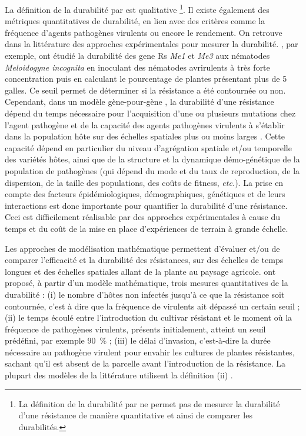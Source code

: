 	La définition de la durabilité par \citet{Johnson1984} est qualitative \footnote{La définition de la durabilité par \citet{Johnson1984} ne permet pas de mesurer la durabilité d'une résistance de manière quantitative et ainsi de comparer les durabilités.}. 
Il existe également des métriques quantitatives de durabilité, en lien avec des critères comme la fréquence d'agents pathogènes virulents ou encore le rendement. On retrouve dans la littérature des approches expérimentales pour mesurer la durabilité.
\citet{Barbary2014}, par exemple, ont étudié la durabilité des \glspl{gene R} \textit{Me1}  et \textit{Me3}  aux nématodes \textit{Meloidogyne incognita} en inoculant des nématodes avrirulents à très forte concentration puis en calculant le pourcentage de plantes présentant plus de 5 galles. Ce seuil permet de déterminer si la résistance a été contournée ou non. 
Cependant, dans un modèle \og gène-pour-gène  \fg, la durabilité d'une résistance dépend du temps nécessaire pour l'acquisition d'une ou plusieurs  mutations chez l'agent pathogène et de la capacité des agents pathogènes virulents à s'établir dans la population hôte sur des échelles spatiales plus ou moins larges \citep{Barrett2008, Brown2015, McDonald2002,  Stuthman2007, vandenBosch2003, Zhan2015}. Cette capacité dépend en particulier du niveau d’agrégation spatiale et/ou temporelle des variétés hôtes, ainsi que de la structure et la dynamique démo-génétique de la population de pathogènes (qui dépend du mode  et du taux de reproduction, de la dispersion, de la taille des populations, des coûts de fitness, \textit{etc.}). La prise en compte des facteurs épidémiologiques, démographiques, génétiques  et de leurs interactions  est donc importante pour quantifier la durabilité d'une résistance. Ceci est difficilement réalisable par des approches expérimentales à cause du temps et du coût de la mise en place d'expériences de terrain à grande échelle.

	Les approches de modélisation mathématique permettent d'évaluer et/ou de comparer l'efficacité et la durabilité des résistances, sur des échelles de temps longues et des échelles spatiales allant de la plante au paysage agricole. \citet{vandenBosch2003} ont proposé, à partir d’un modèle mathématique, trois mesures quantitatives de la durabilité : (i) le nombre d’hôtes non infectés  jusqu’à ce que  la résistance soit contournée,
c’est à dire que la fréquence de virulents ait dépassé un certain seuil ; (ii) le temps écoulé entre
l’introduction du cultivar résistant et le moment où la fréquence de pathogènes virulents, présents initialement, atteint un seuil prédéfini, par exemple 90~\% ; (iii) le délai d’invasion, c’est-à-dire la durée nécessaire au  pathogène virulent pour envahir les cultures de plantes résistantes, sachant qu’il est absent
de la parcelle avant l’introduction de la résistance. 
La plupart des modèles de la littérature utilisent la définition (ii) \citep{vandenBosch2003, Fabre2015, Lof2017}.


